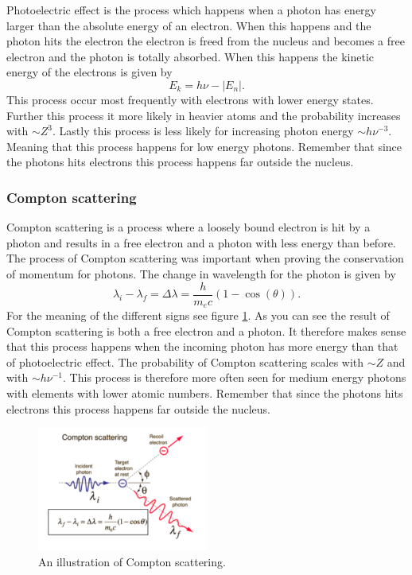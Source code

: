 \documentclass[jmp, amsmath, amssymb, reprint]{article}
\numberwithin{equation}{section}
\newcommand{\lp}{\left(}
\newcommand{\rp}{\right)}
\begin{document}
\begin{multicols}{2}
Photoelectric effect is the process which happens when a photon has energy larger than the absolute energy of an electron. When this happens and the photon hits the electron the electron is freed from the nucleus and becomes a free electron and the photon is totally absorbed. When this happens the kinetic energy of the electrons is given by
\begin{equation}
E_k =h\nu-|E_n|.
\end{equation}
This process occur most frequently with electrons with lower energy states. Further this process it more likely in heavier atoms and the probability increases with \(\sim Z^3\). Lastly this process is less likely for increasing photon energy \(\sim h\nu^{-3}\). Meaning that this process happens for low energy photons. Remember that since the photons hits electrons this process happens far outside the nucleus.

\subsubsection{Compton scattering}

Compton scattering is a process where a loosely bound electron is hit by a photon and results in a free electron and a photon with less energy than before. The process of Compton scattering was important when proving the conservation of momentum for photons. The change in wavelength for the photon is given by
\begin{equation}
\lambda_i-\lambda_f=\Delta\lambda=\frac{h}{m_ec}\lp 1-\cos\lp\theta\rp\rp.
\end{equation}
For the meaning of the different signs see figure \ref{fig:compton}. As you can see the result of Compton scattering is both a free electron and a photon. It therefore makes sense that this process happens when the incoming photon has more energy than that of photoelectric effect. The probability of Compton scattering scales with \(\sim Z\) and with \(\sim h\nu^{-1}\). This process is therefore more often seen for medium energy photons with elements with lower atomic numbers. Remember that since the photons hits electrons this process happens far outside the nucleus.

\begin{figure}[H]
	\centering
  	\includegraphics[width=0.50\textwidth]{compton.png}
	\caption{An illustration of Compton scattering.}
	\label{fig:compton}
\end{figure}



\end{multicols}
\end{document}
